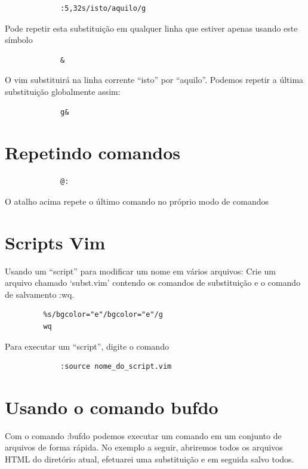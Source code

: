 \documentclass[10pt,a4paper,openany]{book}
\begin{document}
\begin{verbatim}
			 :5,32s/isto/aquilo/g
\end{verbatim}

Pode repetir esta substituição em qualquer linha que estiver apenas usando este símbolo

\begin{verbatim}
			 &
\end{verbatim}

O vim substituirá na linha corrente ``isto'' por ``aquilo''. Podemos
repetir a última substituição globalmente assim:
	
\begin{verbatim}
             g&
\end{verbatim}

\section{Repetindo comandos}\label{Repetindo comandos}

\begin{verbatim}
			 @:
\end{verbatim}

O atalho acima repete o último comando no próprio modo de comandos

\section{Scripts Vim}\label{Scripts Vim}
Usando um ``script'' para modificar um nome em vários arquivos: 
Crie um arquivo chamado `subst.vim' contendo os comandos de substituição e o
comando de salvamento :wq.

\begin{verbatim}
		 %s/bgcolor="e"/bgcolor="e"/g
		 wq
\end{verbatim}

Para executar um ``script'', digite o comando

\begin{verbatim}
			 :source nome_do_script.vim
\end{verbatim}

\section{Usando o comando bufdo}\label{Usando o comando bufdo}

Com o comando :bufdo podemos executar um comando em um
conjunto de arquivos de forma rápida. No exemplo a seguir, abriremos
todos os arquivos HTML do diretório atual, efetuarei uma substituição
e em seguida salvo todos.
\end{document}
